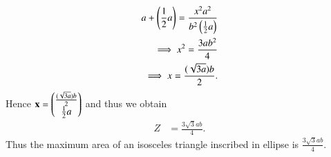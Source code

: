 \documentclass[journal,12pt,twocolumn]{IEEEtran}
\begin{document}
\begin{align}
    a+\left(\frac{1}{2}a\right) = \frac{x^2a^2}{b^2\left(\frac{1}{2}a\right)}
    \\ \implies x^2 = \frac{3ab^2}{4} \\
    \implies x= \frac{(\sqrt{3a})b}{2}.
\end{align}
Hence $\mathbf{x} = \begin{pmatrix}\frac{(\sqrt{3a})b}{2} \\ \frac{1}{2}a\end{pmatrix}$ and thus we obtain
\begin{equation}
\begin{aligned}
    Z &= \frac{3\sqrt{3}ab}{4}.
\end{aligned}
\end{equation}
Thus the maximum area of an isosceles triangle inscribed in ellipse is $\frac{3\sqrt{3}ab}{4}.$
\end{document}
